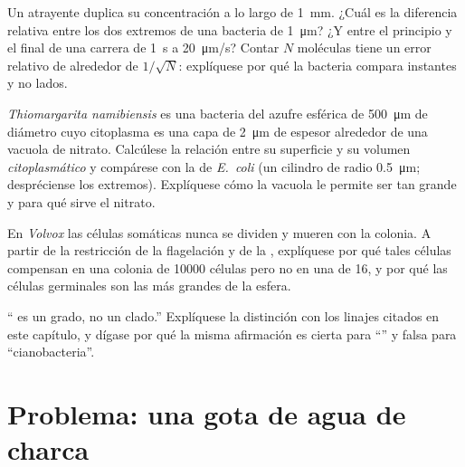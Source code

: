 \begin{exercise}[$\star\star$]\label{exo:b2:unicellular-diversity:9}
Un atrayente duplica su concentración a lo largo de \qty{1}{mm}. ¿Cuál
es la diferencia relativa entre los dos extremos de una bacteria de
\qty{1}{\micro m}? ¿Y entre el principio y el final de una carrera de
\qty{1}{s} a \qty{20}{\micro m/s}? Contar $N$ moléculas tiene un error
relativo de alrededor de $1/\sqrt{N}$: explíquese por qué la bacteria
compara instantes y no lados.
\end{exercise}

\begin{exercise}[$\star\star\star$]\label{exo:b2:unicellular-diversity:10}
\emph{Thiomargarita namibiensis} es una bacteria del azufre esférica de
\qty{500}{\micro m} de diámetro cuyo citoplasma es una capa de
\qty{2}{\micro m} de espesor alrededor de una vacuola de nitrato.
Calcúlese la relación entre su superficie y su volumen
\emph{citoplasmático} y compárese con la de \emph{E.~coli} (un cilindro
de radio \qty{0.5}{\micro m}; despréciense los extremos). Explíquese cómo
la vacuola le permite ser tan grande y para qué sirve el nitrato.
\end{exercise}

\begin{exercise}[$\star\star\star$]\label{exo:b2:unicellular-diversity:11}
En \emph{Volvox} las células somáticas nunca se dividen y mueren con la
colonia. A partir de la restricción de la flagelación y de la , explíquese por qué tales células compensan en una colonia de
\num{10000} células pero no en una de 16, y por qué las células
germinales son las más grandes de la esfera.
\end{exercise}

\begin{exercise}[$\star\star\star$]\label{exo:b2:unicellular-diversity:12}
`` es un grado, no un clado.'' Explíquese la distinción con los
linajes citados en este capítulo, y dígase por qué la misma afirmación
es cierta para ``'' y falsa para ``cianobacteria''.
\end{exercise}

\section{Problema: una gota de agua de charca}

